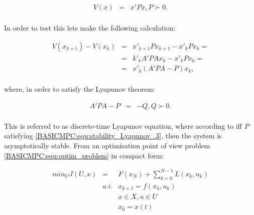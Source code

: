 \begin{equation}
        \begin{array}{rcl}
				V(x)&=&x'Px, P\succ 0.\\
        \end{array}
        \label{BASICMPC:equ:stability_Lyapunov_1}
    \end{equation}
		
	In order to test this lets make the following calculation:
	
	\begin{equation}
        \begin{array}{rcl}
				V(x_{k+1})-V(x_{k})&=&x'_{k+1}Px_{k+1}-x'_{k}Px_{k}=\\
				&=&k'_kA'PAx_k-x'_kPx_k=\\
				&=&x'_k(A'PA-P)x_k,\\
        \end{array}
        \label{BASICMPC:equ:stability_Lyapunov_2}
    \end{equation}
		
		where, in order to satisfy the Lyapunov theorem:
		
		\begin{equation}
        \begin{array}{rcl}
				A'PA-P&=&-Q, Q\succ 0.\\
        \end{array}
        \label{BASICMPC:equ:stability_Lyapunov_3}
    \end{equation}
		
	This is referred to as discrete-time Lyapunov equation, where  according to \cite{borrelli2017predictive} iff $P$ satisfying \ref{BASICMPC:equ:stability_Lyapunov_3}, then the system is asymptotically stable. From an optimisation point of view problem \ref{BASICMPC:equ:optim_problem} in compact form:
	
\begin{equation}
        \begin{array}{rcl}
				min_UJ(U,x)&=&F(x_N)+\sum^{N-1}_{k=0}L(x_k,u_k) \\
					&a.i.&x_{k+1}=f(x_k,u_k) \\
					&&x\in X, u\in U\\
					&&x_0=x(t)\\
        \end{array}
        \label{BASICMPC:equ:optim_stability}
    \end{equation}

